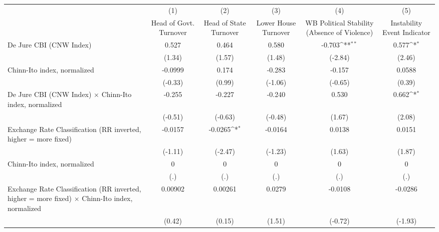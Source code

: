 {
\def\sym#1{\ifmmode^{#1}\else\(^{#1}\)\fi}
\begin{tabular*}{\linewidth}{@{\hskip\tabcolsep\extracolsep\fill}l*{5}{c}}
\hline\hline
                &\multicolumn{1}{c}{(1)}&\multicolumn{1}{c}{(2)}&\multicolumn{1}{c}{(3)}&\multicolumn{1}{c}{(4)}&\multicolumn{1}{c}{(5)}\\
                &\multicolumn{1}{c}{Head of Govt. Turnover}&\multicolumn{1}{c}{Head of State Turnover}&\multicolumn{1}{c}{Lower House Turnover}&\multicolumn{1}{c}{WB Political Stability (Absence of Violence)}&\multicolumn{1}{c}{Instability Event Indicator}\\
\hline
De Jure CBI (CNW Index)&    0.527         &    0.464         &    0.580         &   -0.703\sym{**} &    0.577\sym{*}  \\
                &   (1.34)         &   (1.57)         &   (1.48)         &  (-2.84)         &   (2.46)         \\
[1em]
Chinn-Ito index, normalized&  -0.0999         &    0.174         &   -0.283         &   -0.157         &   0.0588         \\
                &  (-0.33)         &   (0.99)         &  (-1.06)         &  (-0.65)         &   (0.39)         \\
[1em]
De Jure CBI (CNW Index) $\times$ Chinn-Ito index, normalized&   -0.255         &   -0.227         &   -0.240         &    0.530         &    0.662\sym{*}  \\
                &  (-0.51)         &  (-0.63)         &  (-0.48)         &   (1.67)         &   (2.08)         \\
[1em]
Exchange Rate Classification (RR inverted, higher = more fixed)&  -0.0157         &  -0.0265\sym{*}  &  -0.0164         &   0.0138         &   0.0151         \\
                &  (-1.11)         &  (-2.47)         &  (-1.23)         &   (1.63)         &   (1.87)         \\
[1em]
Chinn-Ito index, normalized&        0         &        0         &        0         &        0         &        0         \\
                &      (.)         &      (.)         &      (.)         &      (.)         &      (.)         \\
[1em]
Exchange Rate Classification (RR inverted, higher = more fixed) $\times$ Chinn-Ito index, normalized&  0.00902         &  0.00261         &   0.0279         &  -0.0108         &  -0.0286         \\
                &   (0.42)         &   (0.15)         &   (1.51)         &  (-0.72)         &  (-1.93)         \\

\end{tabular*}}

